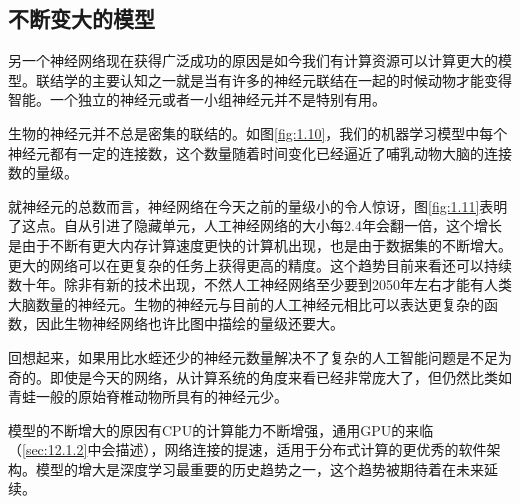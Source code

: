\documentclass[a4paper,11pt]{book}
\begin{document}
\subsection{不断变大的模型}
\label{sec:1.2.3}
另一个神经网络现在获得广泛成功的原因是如今我们有计算资源可以计算更大的模型。联结学的主要认知之一就是当有许多的神经元联结在一起的时候动物才能变得智能。一个独立的神经元或者一小组神经元并不是特别有用。


生物的神经元并不总是密集的联结的。如图\ref{fig:1.10}，我们的机器学习模型中每个神经元都有一定的连接数，这个数量随着时间变化已经逼近了哺乳动物大脑的连接数的量级。


就神经元的总数而言，神经网络在今天之前的量级小的令人惊讶，图\ref{fig:1.11}表明了这点。自从引进了隐藏单元，人工神经网络的大小每2.4年会翻一倍，这个增长是由于不断有更大内存计算速度更快的计算机出现，也是由于数据集的不断增大。更大的网络可以在更复杂的任务上获得更高的精度。这个趋势目前来看还可以持续数十年。除非有新的技术出现，不然人工神经网络至少要到2050年左右才能有人类大脑数量的神经元。生物的神经元与目前的人工神经元相比可以表达更复杂的函数，因此生物神经网络也许比图中描绘的量级还要大。


回想起来，如果用比水蛭还少的神经元数量解决不了复杂的人工智能问题是不足为奇的。即使是今天的网络，从计算系统的角度来看已经非常庞大了，但仍然比类如青蛙一般的原始脊椎动物所具有的神经元少。


模型的不断增大的原因有CPU的计算能力不断增强，通用GPU的来临（\ref{sec:12.1.2}中会描述），网络连接的提速，适用于分布式计算的更优秀的软件架构。模型的增大是深度学习最重要的历史趋势之一，这个趋势被期待着在未来延续。
\end{document}
